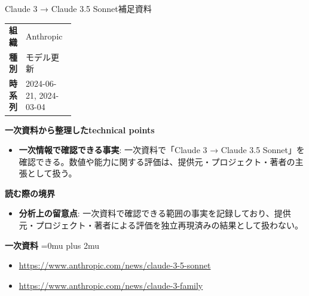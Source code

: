 \begin{technicalnote}{Claude 3 → Claude 3.5 Sonnet}{補足資料}
\begingroup
\begin{tabularx}{\linewidth}{@{}>{\bfseries}p{0.22\linewidth}X@{}}
組織 & Anthropic \\
種別 & モデル更新 \\
時系列 & 2024-06-21, 2024-03-04 \\
\end{tabularx}
\smallskip
{\bfseries 一次資料から整理したtechnical points}
\begin{itemize}[leftmargin=1.5em,itemsep=0.35em]
\item \textbf{一次情報で確認できる事実}: 一次資料で「Claude 3 → Claude 3.5 Sonnet」を確認できる。数値や能力に関する評価は、提供元・プロジェクト・著者の主張として扱う。
\end{itemize}
\begin{minipage}{\linewidth}
{\bfseries 読む際の境界}
\begin{itemize}[leftmargin=1.5em,itemsep=0.35em]
\item \textbf{分析上の留意点}: 一次資料で確認できる範囲の事実を記録しており、提供元・プロジェクト・著者による評価を独立再現済みの結果として扱わない。
\end{itemize}
\begin{samepage}
{\bfseries 一次資料}
\begingroup\sloppy
\Urlmuskip=0mu plus 2mu\relax
\begin{itemize}[leftmargin=1.5em,itemsep=0.25em]
\item {\scriptsize\url{https://www.anthropic.com/news/claude-3-5-sonnet}}
\item {\scriptsize\url{https://www.anthropic.com/news/claude-3-family}}
\end{itemize}
\endgroup
\end{samepage}
\end{minipage}
\endgroup
\end{technicalnote}
\medskip


